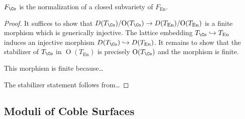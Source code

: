 \documentclass{amsart}
\begin{document}
\begin{theorem}

\(F_{\Co}\) is the normalization of a closed subvariety of \(F_{\operatorname{En}}\).

\end{theorem}

\begin{proof}

It suffices to show that \(D(T_{\Co})/{\operatorname{O}}(T_{\Co}) \to D(T_{\operatorname{En}})/{\operatorname{O}}(T_{\operatorname{En}})\) is a finite morphism which is generically injective. The lattice embedding \(T_{\Co}\hookrightarrow T_{\operatorname{En}}\) induces an injective morphism \(D(T_{\Co}) \hookrightarrow D(T_{\operatorname{En}})\). It remains to show that the stabilizer of \(T_{\Co}\) in \({\operatorname{O}}(T_{\operatorname{En}})\) is precisely \({\operatorname{O}}(T_{\Co})\) and the morphism is finite.

This morphism is finite because\ldots{}

The stabilizer statement follows from\ldots{}

\end{proof}



\subsection{Moduli of Coble Surfaces}\label{moduli-of-coble-surfaces}
\end{document}
